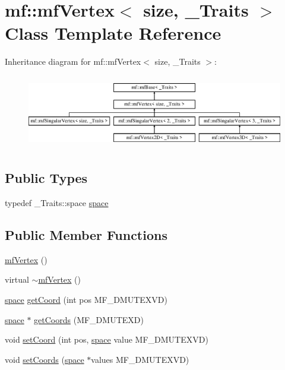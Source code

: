 \hypertarget{classmf_1_1mfVertex}{
\section{mf::mfVertex$<$ size, \_\-Traits $>$ Class Template Reference}
\label{classmf_1_1mfVertex}
}
Inheritance diagram for mf::mfVertex$<$ size, \_\-Traits $>$:\begin{figure}[H]
\begin{center}
\leavevmode
\includegraphics[height=3.260553cm]{classmf_1_1mfVertex}
\end{center}
\end{figure}
\subsection*{Public Types}
\begin{DoxyCompactItemize}
\item 
typedef \_\-Traits::space \hyperlink{classmf_1_1mfVertex_a9710b0b7ac7bbb276e1e97d541cbfc93}{space}
\end{DoxyCompactItemize}
\subsection*{Public Member Functions}
\begin{DoxyCompactItemize}
\item 
\hyperlink{classmf_1_1mfVertex_acfdae23d2d64be447df1e725eb37120f}{mfVertex} ()
\item 
virtual \hyperlink{classmf_1_1mfVertex_a82c8d82620afe828d321cd9c2fbb407b}{$\sim$mfVertex} ()
\item 
\hyperlink{classmf_1_1mfVertex_a9710b0b7ac7bbb276e1e97d541cbfc93}{space} \hyperlink{classmf_1_1mfVertex_aceb8aeb8d52129dd95a3b7948331754a}{getCoord} (int pos MF\_\-DMUTEXVD)
\item 
\hyperlink{classmf_1_1mfVertex_a9710b0b7ac7bbb276e1e97d541cbfc93}{space} $\ast$ \hyperlink{classmf_1_1mfVertex_a0dd251655f259788f1e921a97f425479}{getCoords} (MF\_\-DMUTEXD)
\item 
void \hyperlink{classmf_1_1mfVertex_ad4bb51f29cc783a6ec3a4b91ead078c1}{setCoord} (int pos, \hyperlink{classmf_1_1mfVertex_a9710b0b7ac7bbb276e1e97d541cbfc93}{space} value MF\_\-DMUTEXVD)
\item 
void \hyperlink{classmf_1_1mfVertex_a1fb5e4532e14904f853b1d261bb0f977}{setCoords} (\hyperlink{classmf_1_1mfVertex_a9710b0b7ac7bbb276e1e97d541cbfc93}{space} $\ast$values MF\_\-DMUTEXVD)
\end{DoxyCompactItemize}

